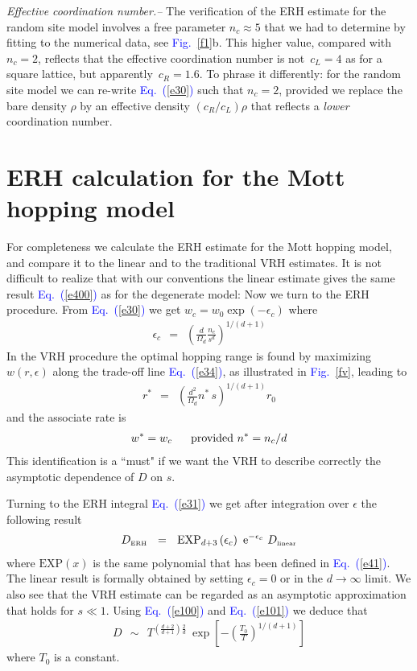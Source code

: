 \documentclass[onecolumn,fleqn,12pt,openany,draft]{book}
\newcommand{\eexp}{\mbox{e}^}
\newcommand{\tbox}[1]{\mbox{\tiny #1}}
\newcommand{\mylabel}[1]{\label{#1}}
\newcommand{\beq}{\begin{eqnarray}}
\newcommand{\eeq}{\end{eqnarray}}
\newcommand{\be}[1]{\begin{eqnarray}\ifthenelse{#1=-1}
{\nonumber}{\ifthenelse{#1=0}{}{\mylabel{e#1}}}}
\newcommand{\Eq}[1]{\textcolor{blue}{Eq.\!\!~(\ref{#1})}}
\newcommand{\Fig}[1]{\textcolor{blue}{Fig.}\!\!~\ref{#1}}
\begin{document}
{\em Effective coordination number.-- } 
The verification of the ERH estimate for the random site model 
involves a free parameter ${n_c\approx5}$ that we had to determine by 
fitting to the numerical data, see \Fig{f1}b.  
This higher value, compared with ${n_c=2}$, 
reflects that the effective coordination number 
is not~$c_L=4$ as for a square lattice,
but apparently~$c_R=1.6$. To phrase it differently: 
for the random site model we can re-write \Eq{e30}
such that ${n_c=2}$, provided we replace the bare 
density $\rho$ by an effective density $(c_R/c_L)\rho$
that reflects a {\em lower} coordination number. 


\section{ERH calculation for the Mott hopping model}
\label{sM}

For completeness we calculate the ERH estimate for the Mott hopping model, 
and compare it to the linear and to the traditional VRH estimates.
It is not difficult to realize that with our conventions the linear  
estimate gives the same result \Eq{e400} as for the degenerate model:
Now we turn to the ERH procedure.
From \Eq{e30} we get  $w_c=w_0\exp(-\epsilon_c)$ where 
%
\beq
\epsilon_c \ \ = \ \ \left( \frac{d}{\Omega_d} \frac{n_c}{s^d} \right)^{1/(d+1)}
\eeq 
%
In the VRH procedure the optimal hopping range 
is found by maximizing $w(r,\epsilon)$ 
along the trade-off line \Eq{e34}, 
as illustrated in \Fig{fv}, leading to 
%
\beq
r^* \ \ = \ \ \left(\frac{d^2}{\Omega_d} n^* \, s \right)^{1/(d+1)} r_0
\eeq 
%
and the associate rate is 
%
\be{46}
w^* = w_c \ \ \ \ \ \text{provided} \ n^*=n_c/d
\eeq 
%
This identification is a ``must" if we want the VRH to 
describe correctly the asymptotic dependence of $D$ on $s$.

Turning to the ERH integral \Eq{e31} we get  
after integration over $\epsilon$ the following result
%
\be{47}
D_{\tbox{ERH}} \ \ = \ \  
\mathrm{EXP}_{d{+}3}\left(\epsilon_c\right)  \  \eexp{-\epsilon_c}  \ D_{\tbox{linear}}
\eeq 
%
where $\mathrm{EXP}(x)$ is the same polynomial that has been 
defined in \Eq{e41}. 
The linear result is formally obtained by setting ${\epsilon_c=0}$
or in the $d\rightarrow\infty$ limit. 
%
We also see that the VRH estimate can be regarded as an 
asymptotic approximation that holds for ${s\ll1}$. 
Using \Eq{e100} and \Eq{e101} we deduce that 
%
\beq
D \ \ \sim \ \ T^{\left(\frac{d+2}{d+1}\right)\frac{2}{d}} 
\  \exp\left[-\left(\frac{T_0}{T}\right)^{1/(d+1)}\right]
\eeq
%
where $T_0$ is a constant. 
\end{document}

